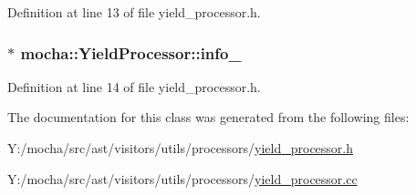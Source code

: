 Definition at line 13 of file yield\_\-processor.h.

\hypertarget{classmocha_1_1_yield_processor_a9e60f7548c1c1af21d232bdba5bf2d90}{
\subsubsection[{info\_\-}]{$\ast$ {\bf mocha::YieldProcessor::info\_\-}}}
\label{classmocha_1_1_yield_processor_a9e60f7548c1c1af21d232bdba5bf2d90}


Definition at line 14 of file yield\_\-processor.h.



The documentation for this class was generated from the following files:\begin{DoxyCompactItemize}
\item 
Y:/mocha/src/ast/visitors/utils/processors/\hyperlink{yield__processor_8h}{yield\_\-processor.h}\item 
Y:/mocha/src/ast/visitors/utils/processors/\hyperlink{yield__processor_8cc}{yield\_\-processor.cc}\end{DoxyCompactItemize}
